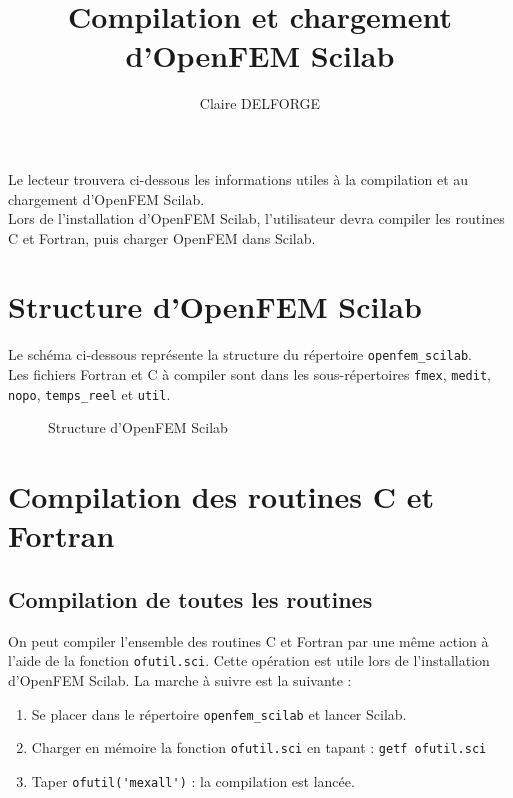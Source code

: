 \documentclass[a4paper]{article}
\author{Claire DELFORGE}
\title{Compilation et chargement d'OpenFEM Scilab}
\date{ }
\begin{document}
\maketitle
Le lecteur trouvera ci-dessous les informations utiles \`a la compilation et au chargement d'OpenFEM Scilab.\\
Lors de l'installation d'OpenFEM Scilab, l'utilisateur devra compiler les routines C et Fortran, puis charger OpenFEM dans Scilab.
\section{Structure d'OpenFEM Scilab}
Le sch\'ema ci-dessous repr\'esente la structure du r\'epertoire \verb+openfem_scilab+.\\
Les fichiers Fortran et C \`a compiler sont dans les sous-r\'epertoires \verb+fmex+, \verb+medit+, \verb+nopo+, \verb+temps_reel+ et \verb+util+.
\begin{center}
\begin{figure}[!h]
\caption{Structure d'OpenFEM Scilab}
\end{figure}
\end{center}

\section{Compilation des routines C et Fortran}
\subsection{Compilation de toutes les routines}
On peut compiler l'ensemble des routines C et Fortran par une m\^eme action \`a l'aide de la fonction \verb+ofutil.sci+. Cette op\'eration est utile lors de l'installation d'OpenFEM Scilab. La marche \`a suivre est la suivante :
\begin{enumerate}
\item Se placer dans le r\'epertoire \verb+openfem_scilab+ et lancer Scilab.
\item Charger en m\'emoire la fonction \verb+ofutil.sci+ en tapant : \verb+getf ofutil.sci+
\item Taper \verb+ofutil('mexall')+ : la compilation est lanc\'ee.
\end{enumerate}
\end{document}
